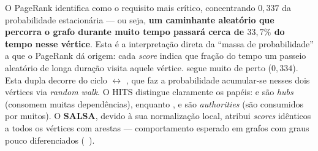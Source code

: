 \begin{table}[ht]
    \centering
    \caption{\emph{Top-3} por algoritmo: CPython \emph{stdlib}.}
    \label{tab:top3-stdlib}
    \footnotesize
\end{table}

O PageRank identifica  como o requisito
mais crítico, concentrando $0{,}337$ da probabilidade estacionária
--- ou seja, \textbf{um caminhante aleatório que percorra o grafo
durante muito tempo passará cerca de $33{,}7\%$ do tempo nesse
vértice}. Esta é a interpretação direta da ``massa de probabilidade''
a que o PageRank dá origem: cada \emph{score} indica que fração do
tempo um passeio aleatório de longa duração visita aquele vértice.
 segue muito de perto ($0{,}334$). Esta dupla
decorre do ciclo
 $\leftrightarrow$ , que faz a
probabilidade acumular-se nesses dois vértices via \emph{random
walk}. O HITS distingue claramente os papéis:  e
 são \emph{hubs} (consomem muitas dependências),
enquanto ,  e
 são \emph{authorities} (são consumidos por
muitos). O \textbf{SALSA}, devido à sua normalização local, atribui
\emph{scores} idênticos a todos os vértices com arestas ---
comportamento esperado em grafos com graus pouco diferenciados
(\cf\ \citealt{lempel2001}).

